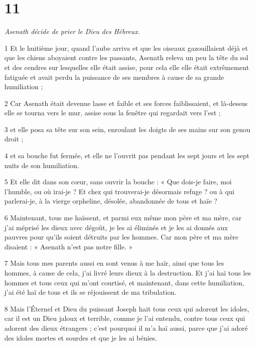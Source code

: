 \chapter{11}

\par \textit{Asenath décide de prier le Dieu des Hébreux.}

\par 1 Et le huitième jour, quand l'aube arriva et que les oiseaux gazouillaient déjà et que les chiens aboyaient contre les passants, Asenath releva un peu la tête du sol et des cendres sur lesquelles elle était assise, pour cela elle elle était extrêmement fatiguée et avait perdu la puissance de ses membres à cause de sa grande humiliation ;

\par 2 Car Asenath était devenue lasse et faible et ses forces faiblissaient, et là-dessus elle se tourna vers le mur, assise sous la fenêtre qui regardait vers l'est ;

\par 3 et elle posa sa tête sur son sein, enroulant les doigts de ses mains sur son genou droit ;

\par 4 et sa bouche fut fermée, et elle ne l'ouvrit pas pendant les sept jours et les sept nuits de son humiliation.

\par 5 Et elle dit dans son cœur, sans ouvrir la bouche : « Que dois-je faire, moi l'humble, ou où irai-je ? Et chez qui trouverai-je désormais refuge ? ou à qui parlerai-je, à la vierge orpheline, désolée, abandonnée de tous et haïe ?

\par 6 Maintenant, tous me haïssent, et parmi eux même mon père et ma mère, car j'ai méprisé les dieux avec dégoût, je les ai éliminés et je les ai donnés aux pauvres pour qu'ils soient détruits par les hommes. Car mon père et ma mère disaient : « Asenath n’est pas notre fille. »

\par 7 Mais tous mes parents aussi en sont venus à me haïr, ainsi que tous les hommes, à cause de cela, j'ai livré leurs dieux à la destruction. Et j'ai haï tous les hommes et tous ceux qui m'ont courtisé, et maintenant, dans cette humiliation, j'ai été haï de tous et ils se réjouissent de ma tribulation.

\par 8 Mais l'Éternel et Dieu du puissant Joseph hait tous ceux qui adorent les idoles, car il est un Dieu jaloux et terrible, comme je l'ai entendu, contre tous ceux qui adorent des dieux étrangers ; c'est pourquoi il m'a haï aussi, parce que j'ai adoré des idoles mortes et sourdes et que je les ai bénies.

